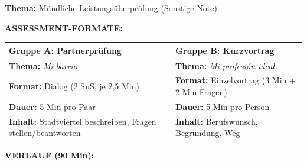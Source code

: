 \documentclass[11pt, a4paper]{article}
\newcommand{\es}[1]{\textcolor{spanisch}{\textit{#1}}}
\begin{document}
\begin{assessmentbox}[title={DS 5 -- ASSESSMENT (Mo, 19.01.2026)}]

\textbf{Thema:} Mündliche Leistungsüberprüfung (Sonstige Note)

\vspace{0.3cm}


\vspace{0.3cm}

\textbf{ASSESSMENT-FORMATE:}

\begin{center}
\begin{tabular}{|p{6cm}|p{6cm}|}
\hline
\rowcolor{gruppeA!15}
\textbf{\textcolor{gruppeA}{Gruppe A: Partnerprüfung}} & \textbf{\textcolor{gruppeB}{Gruppe B: Kurzvortrag}} \\
\hline
\textbf{Thema:} \es{Mi barrio} & \textbf{Thema:} \es{Mi profesión ideal} \\
\hline
\textbf{Format:} Dialog (2 SuS, je 2,5 Min) & \textbf{Format:} Einzelvortrag (3 Min + 2 Min Fragen) \\
\hline
\textbf{Dauer:} 5 Min pro Paar & \textbf{Dauer:} 5 Min pro Person \\
\hline
\textbf{Inhalt:} Stadtviertel beschreiben, Fragen stellen/beantworten & \textbf{Inhalt:} Berufswunsch, Begründung, Weg \\
\hline
\end{tabular}
\end{center}

\vspace{0.2cm}

\textbf{VERLAUF (90 Min):}


\end{assessmentbox}
\end{document}
